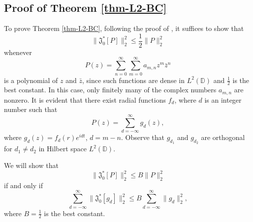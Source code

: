 \documentclass[a4paper,12pt]{amsart}
\theoremstyle{definition}
\numberwithin{equation}{section}
\newcommand{\ID}{{\mathbb D}}
\def\be{\begin{equation}}
\def\ee{\end{equation}}
\begin{document}
\subsection*{Proof of Theorem \ref{thm-L2-BC}}
To prove Theorem \ref{thm-L2-BC}, following the proof of \cite[Theorem 5.2 and Corollary 5.3]{kalaj1}, it suffices to show that
$$\|\mathfrak{J}_0^*[P]\|_{2}^2\leq\frac{1}{2}\|P\|_{2}^2$$
whenever
$$P(z)=\sum\limits_{n=0}^{\infty}\sum\limits_{m=0}^{\infty}a_{m, n}z^m\bar{z}^n$$
is a polynomial of $z$ and $\bar{z}$, since such functions are dense in $L^2(\ID)$ and $\frac{1}{2}$ is the best constant.
In this case, only finitely many of the complex numbers $a_{m, n}$ are nonzero. It is evident that there exist radial functions
$f_d$, where $d$ is an integer number such that
$$P(z)=\sum\limits_{d=-\infty}^{\infty}g_d(z),$$
where $g_d(z)=f_d(r)e^{idt}$, $d=m-n$. Observe that $g_{d_1}$ and $g_{d_2}$ are orthogonal for $d_1\neq d_2$ in Hilbert space $L^2(\ID)$.

We will show that
\be\label{2020-May-2}\|\mathfrak{J}_0^*[P]\|_{2}^2\leq B\|P\|_{2}^2\ee
if and only if
\be\label{June-27-1}\sum\limits_{d=-\infty}^{\infty}\|\mathfrak{J}_0^*[g_d]\|_{2}^2\leq B\sum\limits_{d=-\infty}^{\infty}\|g_d\|_{2}^2,\ee
where $B=\frac{1}{2}$ is the best constant.
\end{document}
